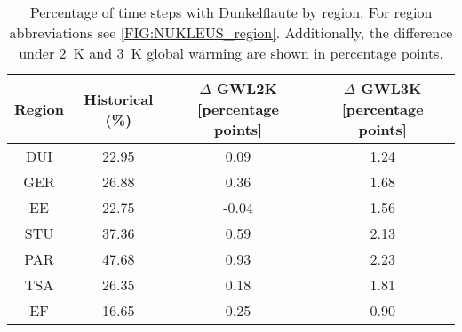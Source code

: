 \begin{table}[!htbp]
\centering
\caption{Percentage of time steps with Dunkelflaute by region. For region abbreviations see \autoref{FIG:NUKLEUS_region}. Additionally, the difference under \qty{2}{\kelvin} and \qty{3}{\kelvin} global warming are shown in percentage points.}
\label{Table:Dunkelflaute_regions}
\begin{tabular}{cccc}
\hline
Region & Historical (\%) & $\Delta$ GWL2K [percentage points] & $\Delta$ GWL3K [percentage points] \\
\hline
DUI & 22.95 & 0.09 & 1.24\\

GER & 26.88 & 0.36 & 1.68\\

EE & 22.75 & -0.04 & 1.56\\

STU & 37.36 & 0.59 & 2.13\\

PAR & 47.68 & 0.93 & 2.23\\

TSA & 26.35 & 0.18 & 1.81\\

EF & 16.65 & 0.25 & 0.90\\

\bottomrule
\end{tabular}
\end{table}
